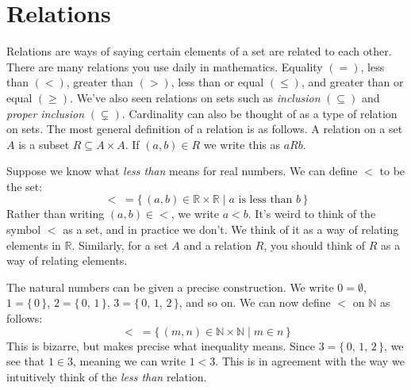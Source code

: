 \documentclass{article}
\theoremstyle{plain}
\theoremstyle{normal}
\newenvironment{example}{%
    \pushQED{\qed}\renewcommand{\qedsymbol}{$\blacksquare$}\examplex%
}{%
    \popQED\endexamplex%
}
\newenvironment{definition}{%
    \pushQED{\qed}\renewcommand{\qedsymbol}{$\blacksquare$}\definitionx%
}{%
    \popQED\enddefinitionx%
}
\begin{document}
    \section{Relations}
        Relations are ways of saying certain elements of a set are related to
        each other. There are many relations you use daily in mathematics.
        Equality $(=)$, less than $(<)$, greater than $(>)$, less than or equal
        $(\leq)$, and greater than or equal $(\geq)$. We've also seen relations
        on sets such as \textit{inclusion} $(\subseteq)$ and
        \textit{proper inclusion} $(\subsetneq)$. Cardinality can also be
        thought of as a type of relation on sets. The most general definition
        of a relation is as follows.
        \begin{definition}[\textbf{Relation}]
            A relation on a set $A$ is a subset $R\subseteq{A}\times{A}$.
        \end{definition}
        If $(a,b)\in{R}$ we write this as $aRb$.
        \begin{example}
            Suppose we know what \textit{less than} means for real numbers.
            We can define $<$ to be the set:
            \begin{equation}
                <\;=\{\,(a,b)\in\mathbb{R}\times\mathbb{R}\;|\;
                    a\textrm{ is less than }b\,\}
            \end{equation}
            Rather than writing $(a,b)\in{<}$, we write
            $a<b$. It's weird to think of the symbol $<$ as a set, and in
            practice we don't. We think of it as a way of relating elements
            in $\mathbb{R}$. Similarly, for a set $A$ and a relation $R$,
            you should think of $R$ as a way of relating elements.
        \end{example}
        \begin{example}
            The natural numbers can be given a precise construction. We write
            $0=\emptyset$, $1=\{\,0\,\}$, $2=\{\,0,\,1\,\}$,
            $3=\{\,0,\,1,\,2\,\}$, and so on. We can now define
            $<$ on $\mathbb{N}$ as follows:
            \begin{equation}
                <\;=\{\,(m,n)\in\mathbb{N}\times\mathbb{N}\;|\;m\in{n}\,\}
            \end{equation}
            This is bizarre, but makes precise what inequality means.
            Since $3=\{\,0,\,1,\,2\,\}$, we see that $1\in{3}$, meaning
            we can write $1<3$. This is in agreement with the way we intuitively
            think of the \textit{less than} relation.
        \end{example}
\end{document}
